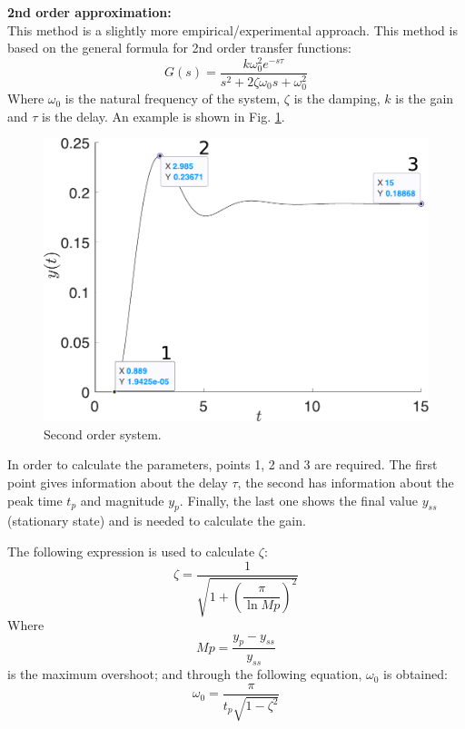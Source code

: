 \textbf{2nd order approximation:\\} This method is a slightly more empirical/experimental approach. This method is based on the general formula for 2nd order transfer functions:
\begin{equation}
    G(s)=\dfrac{k\omega^2_0e^{-s\tau}}{s^2+2\zeta\omega_0s+\omega_0^2}
\end{equation}
Where $\omega_0$ is the natural frequency of the system, $\zeta$ is the damping, $k$ is the gain and $\tau$ is the delay. An example is shown in Fig. \ref{fig:example2ndOrder}.
\begin{figure}[H]
    \centering
    \includegraphics[scale=0.4]{figs/sis2ndOrder.pdf}
    \caption{Second order system.}
    \label{fig:example2ndOrder}
\end{figure}
In order to calculate the parameters, points 1, 2 and 3 are required. The first point gives information about the delay $\tau$, the second has information about the peak time $t_p$ and magnitude $y_p$. Finally, the last one shows the final value $y_{ss}$ (stationary state) and is needed to calculate the gain.

The following expression is used to calculate $\zeta$:
\begin{equation}
    \zeta=\dfrac{1}{\sqrt{1+\left(\dfrac{\pi}{\ln Mp}\right)^2}}
\end{equation}
Where
\begin{equation}
    Mp=\dfrac{y_p-y_{ss}}{y_{ss}}
\end{equation}
is the maximum overshoot; and through the following equation, $\omega_0$ is obtained:
\begin{equation}
    \omega_0=\dfrac{\pi}{t_p\sqrt{1-\zeta^2}}
\end{equation}

